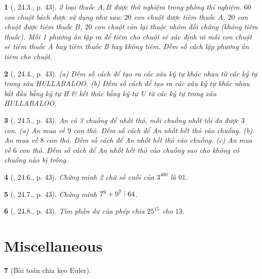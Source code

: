 \documentclass{article}
\newtheorem{baitoan}{}
\DeclareRobustCommand{\divby}{%
	\mathrel{\vbox{\baselineskip.65ex\lineskiplimit0pt\hbox{.}\hbox{.}\hbox{.}}}%
}
\begin{document}
\begin{baitoan}[\cite{Hai_Hung_Thu_Tung_ncpt_Toan_10_tap_2}, 24.3., p. 43]
	2 loại thuốc $A,B$ được thử nghiệm trong phòng thí nghiệm. $60$ con chuột bách được sử dụng như sau: $20$ con chuột được tiêm thuốc $A$, $20$ con chuột được tiêm thuốc $B$, $20$ con chuột còn lại thuộc nhóm đối chứng (không tiêm thuốc). Mỗi 1 phương án lập ra để tiêm cho chuột sẽ xác định rõ mỗi con chuột sẽ tiêm thuốc A hay tiêm thuốc B hay không tiêm. Đếm số cách lập phương án tiêm cho chuột.
\end{baitoan}

\begin{baitoan}[\cite{Hai_Hung_Thu_Tung_ncpt_Toan_10_tap_2}, 24.4., p. 43]
	(a) Đếm số cách để tạo ra các xâu ký tự khác nhau từ các ký tự trong xâu {\rm HULLABALOO}. (b) Đếm số cách để tạo ra các xâu ký tự khác nhau bắt đầu bằng ký tự H \& kết thúc bằng ký tự U từ các ký tự trong xâu {\rm HULLABALOO}.
\end{baitoan}

\begin{baitoan}[\cite{Hai_Hung_Thu_Tung_ncpt_Toan_10_tap_2}, 24.5., p. 43]
	An có 3 chuồng để nhốt thỏ, mỗi chuồng nhốt tối đa được $3$ con. (a) An mua về $9$ con thỏ. Đếm số cách để An nhốt hết thỏ vào chuồng. (b) An mua về $8$ con thỏ. Đếm số cách để An nhốt hết thỏ vào chuồng. (c) An mua về $6$ con thỏ. Đếm số cách để An nhốt hết thỏ vào chuồng sao cho không có chuồng nào bị trống.
\end{baitoan}

\begin{baitoan}[\cite{Hai_Hung_Thu_Tung_ncpt_Toan_10_tap_2}, 24.6., p. 43]
	Chứng minh 2 chữ số cuối của $3^{400}$ là $01$.
\end{baitoan}

\begin{baitoan}[\cite{Hai_Hung_Thu_Tung_ncpt_Toan_10_tap_2}, 24.7., p. 43]
	Chứng minh $7^9 + 9^7\divby64$.
\end{baitoan}

\begin{baitoan}[\cite{Hai_Hung_Thu_Tung_ncpt_Toan_10_tap_2}, 24.8., p. 43]
	Tìm phần dư của phép chia $25^{15}$ cho $13$.
\end{baitoan}


\section{Miscellaneous}

\begin{baitoan}[Bài toán chia kẹo Euler]
	
\end{baitoan}


\printbibliography[heading=bibintoc]
	
\end{document}
